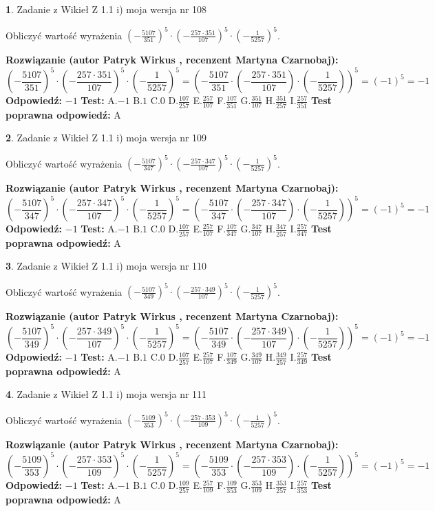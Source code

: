 \documentclass[12pt, a4paper]{article}
\theoremstyle{definition} %
\newtheorem{zad}{}
\newcommand{\zadStart}[1]{\begin{zad}#1\newline}
\newcommand{\zadStop}{\end{zad}}
\newcommand{\rozwStart}[2]{\noindent \textbf{Rozwiązanie (autor #1 , recenzent #2): }\newline}
\newcommand{\rozwStop}{\newline}
\newcommand{\odpStart}{\noindent \textbf{Odpowiedź:}\newline}
\newcommand{\odpStop}{\newline}
\newcommand{\testStart}{\noindent \textbf{Test:}\newline}
\newcommand{\testStop}{\newline}
\newcommand{\kluczStart}{\noindent \textbf{Test poprawna odpowiedź:}\newline}
\newcommand{\kluczStop}{\newline}
\begin{document}
\zadStart{Zadanie z Wikieł Z 1.1 i) moja wersja nr 108}

Obliczyć wartość wyrażenia $(-\frac{5107}{351})^{5} \cdot (-\frac{257 \cdot 351}{107})^{5} \cdot (-\frac{1}{5257})^{5}$.
\zadStop
\rozwStart{Patryk Wirkus}{Martyna Czarnobaj}
$$(-\frac{5107}{351})^{5} \cdot (-\frac{257 \cdot 351}{107})^{5} \cdot (-\frac{1}{5257})^{5} = (-\frac{5107}{351} \cdot (-\frac{257 \cdot 351}{107}) \cdot (-\frac{1}{5257}))^{5} = (-1)^{5} = -1$$
\rozwStop
\odpStart
$-1$
\odpStop
\testStart
A.$-1$ B.$1$ C.$0$ D.$\frac{107}{257}$ E.$\frac{257}{107}$
F.$\frac{107}{351}$ G.$\frac{351}{107}$
H.$\frac{351}{257}$
I.$\frac{257}{351}$
\testStop
\kluczStart
A
\kluczStop



\zadStart{Zadanie z Wikieł Z 1.1 i) moja wersja nr 109}

Obliczyć wartość wyrażenia $(-\frac{5107}{347})^{5} \cdot (-\frac{257 \cdot 347}{107})^{5} \cdot (-\frac{1}{5257})^{5}$.
\zadStop
\rozwStart{Patryk Wirkus}{Martyna Czarnobaj}
$$(-\frac{5107}{347})^{5} \cdot (-\frac{257 \cdot 347}{107})^{5} \cdot (-\frac{1}{5257})^{5} = (-\frac{5107}{347} \cdot (-\frac{257 \cdot 347}{107}) \cdot (-\frac{1}{5257}))^{5} = (-1)^{5} = -1$$
\rozwStop
\odpStart
$-1$
\odpStop
\testStart
A.$-1$ B.$1$ C.$0$ D.$\frac{107}{257}$ E.$\frac{257}{107}$
F.$\frac{107}{347}$ G.$\frac{347}{107}$
H.$\frac{347}{257}$
I.$\frac{257}{347}$
\testStop
\kluczStart
A
\kluczStop



\zadStart{Zadanie z Wikieł Z 1.1 i) moja wersja nr 110}

Obliczyć wartość wyrażenia $(-\frac{5107}{349})^{5} \cdot (-\frac{257 \cdot 349}{107})^{5} \cdot (-\frac{1}{5257})^{5}$.
\zadStop
\rozwStart{Patryk Wirkus}{Martyna Czarnobaj}
$$(-\frac{5107}{349})^{5} \cdot (-\frac{257 \cdot 349}{107})^{5} \cdot (-\frac{1}{5257})^{5} = (-\frac{5107}{349} \cdot (-\frac{257 \cdot 349}{107}) \cdot (-\frac{1}{5257}))^{5} = (-1)^{5} = -1$$
\rozwStop
\odpStart
$-1$
\odpStop
\testStart
A.$-1$ B.$1$ C.$0$ D.$\frac{107}{257}$ E.$\frac{257}{107}$
F.$\frac{107}{349}$ G.$\frac{349}{107}$
H.$\frac{349}{257}$
I.$\frac{257}{349}$
\testStop
\kluczStart
A
\kluczStop



\zadStart{Zadanie z Wikieł Z 1.1 i) moja wersja nr 111}

Obliczyć wartość wyrażenia $(-\frac{5109}{353})^{5} \cdot (-\frac{257 \cdot 353}{109})^{5} \cdot (-\frac{1}{5257})^{5}$.
\zadStop
\rozwStart{Patryk Wirkus}{Martyna Czarnobaj}
$$(-\frac{5109}{353})^{5} \cdot (-\frac{257 \cdot 353}{109})^{5} \cdot (-\frac{1}{5257})^{5} = (-\frac{5109}{353} \cdot (-\frac{257 \cdot 353}{109}) \cdot (-\frac{1}{5257}))^{5} = (-1)^{5} = -1$$
\rozwStop
\odpStart
$-1$
\odpStop
\testStart
A.$-1$ B.$1$ C.$0$ D.$\frac{109}{257}$ E.$\frac{257}{109}$
F.$\frac{109}{353}$ G.$\frac{353}{109}$
H.$\frac{353}{257}$
I.$\frac{257}{353}$
\testStop
\kluczStart
A
\kluczStop
\end{document}
